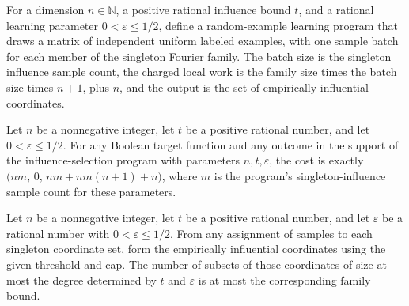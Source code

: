 \begin{definition}
\label{FABL.monotoneInfluenceSelectionProgram}
\leanok
{}
For a dimension $n\in\mathbb{N}$, a positive rational influence bound $t$, and a
rational learning parameter $0<\varepsilon\leq 1/2$, define a random-example learning
program that draws a matrix of independent uniform labeled examples, with one sample
batch for each member of the singleton Fourier family. The batch size is the singleton
influence sample count, the charged local work is the family size times the batch size
times $n+1$, plus $n$, and the output is the set of empirically influential coordinates.
\end{definition}

\begin{theorem}
\label{FABL.monotoneInfluenceSelectionProgram_cost_eq}
\leanok
{}
Let $n$ be a nonnegative integer, let $t$ be a positive rational number, and let
$0<\varepsilon\le 1/2$. For any Boolean target function and any outcome in the support
of the influence-selection program with parameters $n,t,\varepsilon$, the cost is
exactly $\bigl(nm,\,0,\,nm+nm(n+1)+n\bigr)$, where $m$ is the program's
singleton-influence sample count for these parameters.
\end{theorem}

\begin{theorem}
\label{FABL.card_lowDegreeSubsets_empiricalInfluentialCoordinates_le}
\leanok
{}
Let $n$ be a nonnegative integer, let $t$ be a positive rational number, and let
$\varepsilon$ be a rational number with $0<\varepsilon\le 1/2$. From any assignment of
samples to each singleton coordinate set, form the empirically influential coordinates
using the given threshold and cap. The number of subsets of those coordinates of size at
most the degree determined by $t$ and $\varepsilon$ is at most the corresponding family
bound.
\end{theorem}

